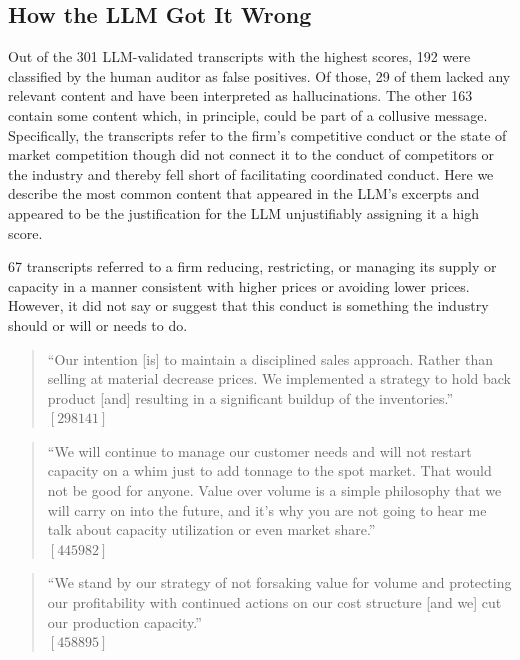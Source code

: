 \subsection{How the LLM Got It Wrong}
Out of the 301 LLM-validated transcripts with the highest scores, 192 were classified by the human auditor as false positives. Of those, 29 of them lacked any relevant content and have been interpreted as hallucinations. The other 163 contain some content which, in principle, could be part of a collusive message. Specifically, the transcripts refer to the firm’s competitive conduct or the state of market competition though did not connect it to the conduct of competitors or the industry and thereby fell short of facilitating coordinated conduct. Here we describe the most common content that appeared in the LLM’s excerpts and appeared to be the justification for the LLM unjustifiably assigning it a high score.

67 transcripts referred to a firm reducing, restricting, or managing its supply or capacity in a manner consistent with higher prices or avoiding lower prices. However, it did not say or suggest that this conduct is something the industry should or will or needs to do.

\begin{quote}
``Our intention [is] to maintain a disciplined sales approach. Rather than selling at material decrease prices. We implemented a strategy to hold back product [and] resulting in a significant buildup of the inventories.'' \\
$[298141]$
\end{quote}

\begin{quote}
``We will continue to manage our customer needs and will not restart capacity on a whim just to add tonnage to the spot market. That would not be good for anyone. Value over volume is a simple philosophy that we will carry on into the future, and it's why you are not going to hear me talk about capacity utilization or even market share.'' \\
$[445982]$
\end{quote}

\begin{quote}
``We stand by our strategy of not forsaking value for volume and protecting our profitability with continued actions on our cost structure [and we] cut our production capacity.'' \\
$[458895]$
\end{quote}


